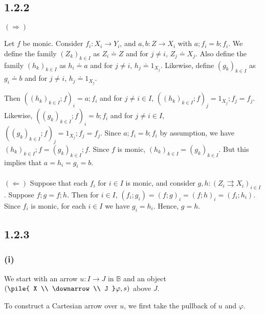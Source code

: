\documentclass{article}
\newcommand{\vrt}[2]{
\pile{
#1 \\
\downarrow \\
#2
}
}
\begin{document}
\subsection*{1.2.2}

$(\Rightarrow)$

Let $f$ be monic.
Consider $f_i : X_i \to Y_i$, and $a,b : Z \to X_i$ with $a;f_i = b;f_i$. We define the 
family $(Z_k)_{k \in I}$ as $Z_i \doteq Z$ and for $j \neq i$, $Z_j \doteq X_j$.
Also define the family $(h_k)_{k \in I}$ as $h_i \doteq a$ and for $j \neq i$, $h_j \doteq 1_{X_j}$.
Likewise, define $(g_k)_{k \in I}$ as $g_i \doteq b$ and for $j \neq i$, $h_j \doteq 1_{X_j}$.

Then $((h_k)_{k \in I};f)_i = a;f_i$ and for $j \neq i \in I$, $((h_k)_{k \in I};f)_j = 1_{X_j};f_j = f_j$.
Likewise, $((g_k)_{k \in I};f)_i = b;f_i$ and for $j \neq i \in I$, $((g_k)_{k \in I};f)_j = 1_{X_j};f_j = f_j$.
Since $a;f_i = b;f_i$ by assumption, we have $(h_k)_{k \in I};f = (g_k)_{k \in I};f$. Since $f$ is monic,
$(h_k)_{k \in I} = (g_k)_{k \in I}$. But this implies that $a = h_i = g_i = b$.
~\\~\\
$(\Leftarrow)$
Suppose that each $f_i$ for $i \in I$ is monic, and consider $g,h : (Z_i \rightrightarrows X_i)_{i \in I}$.
Suppose $f;g = f;h$. Then for $i \in I$, $(f_i;g_i) = (f;g)_i = (f;h)_i = (f_i;h_i)$. Since $f_i$ is monic,
for each $i \in I$ we have $g_i = h_i$. Hence, $g = h$.

\subsection*{1.2.3}

\subsubsection*{(i)}

We start with an arrow $u : I \to J$ in $\mathbb B$ and an object $(\vrt{X}{J}\varphi, s)$ above $J$.


To construct a Cartesian arrow over $u$, we first take the pullback of $u$ and $\varphi$.
\end{document}

